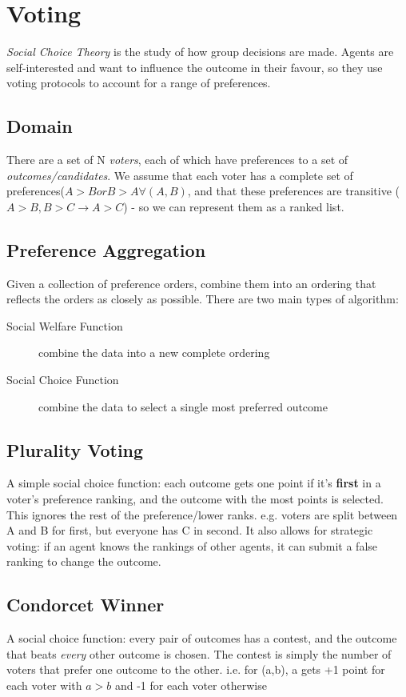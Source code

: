 \section{Voting}
\emph{Social Choice Theory} is the study of how group decisions are made. Agents are self-interested and want to influence the outcome in their favour, so they use voting protocols to account for a range of preferences.

\subsection{Domain}
There are a set of N \emph{voters}, each of which have preferences to a set of \emph{outcomes/candidates}. We assume that each voter has a complete set of preferences($A>B or B>A \forall (A,B)$, and that these preferences are transitive ($A>B,B>C\rightarrow A>C$) - so we can represent them as a ranked list.

\subsection{Preference Aggregation}
Given a collection of preference orders, combine them into an ordering that reflects the orders as closely as possible. There are two main types of algorithm:
\begin{description}
    \item[Social Welfare Function] combine the data into a new complete ordering
    \item[Social Choice Function] combine the data to select a single most preferred outcome
\end{description}

\subsection{Plurality Voting}
A simple social choice function: each outcome gets one point if it's \textbf{first} in a voter's preference ranking, and the outcome with the most points is selected.\\
This ignores the rest of the preference/lower ranks. e.g. voters are split between A and B for first, but everyone has C in second. It also allows for strategic voting: if an agent knows the rankings of other agents, it can submit a false ranking to change the outcome.

\subsection{Condorcet Winner}
A social choice function: every pair of outcomes has a contest, and the outcome that beats \emph{every} other outcome is chosen. The contest is simply the number of voters that prefer one outcome to the other. i.e. for (a,b), a gets +1 point for each voter with $a>b$ and -1 for each voter otherwise

